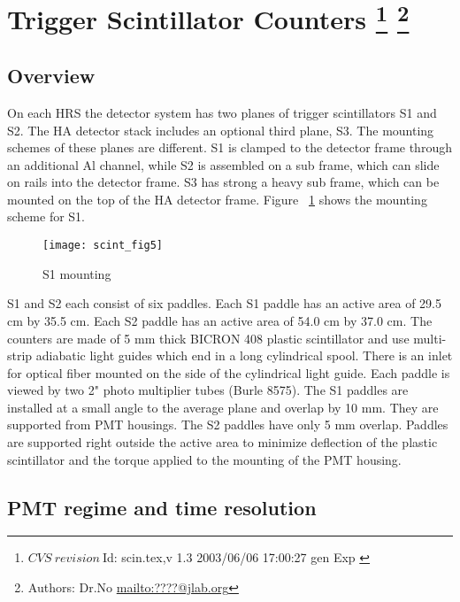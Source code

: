 \section[Trigger Scintillator Counters]{Trigger Scintillator Counters
\footnote{
  $CVS~revision~ $Id: scin.tex,v 1.3 2003/06/06 17:00:27 gen Exp $ $
}
\footnote{Authors: Dr.No \url{mailto:????@jlab.org}}
}
\subsection{Overview}

On each HRS the detector system has two planes of trigger
scintillators S1 and S2.
The HA detector stack includes an optional third plane, S3.
The mounting schemes
of these planes are different. S1 is clamped to the detector
frame through an additional Al channel,
while S2 is assembled on a sub frame, which can slide on rails into the
detector frame.
S3 has strong a heavy sub frame, which can be mounted on the top
of the HA detector frame. Figure ~\ref{fig:s1mount} shows the
mounting scheme for S1.

\begin{figure}[tbh]
\begin{center}
\texttt{[image: scint\_fig5]}
{\linespread{1.}
\caption[Detectors: S1 Mounting]{S1 mounting}
\label{fig:s1mount}}
\end{center}
\end{figure}


S1 and S2 each consist of six paddles. Each S1 paddle has an
active area of 29.5 cm by 35.5 cm.
Each S2 paddle has an active area of 54.0 cm by 37.0 cm. The
counters are made of 5 mm thick BICRON 
408 plastic scintillator and use multi-strip adiabatic light
guides which end in a long cylindrical spool. There is an inlet
for optical fiber mounted on the side of the 
cylindrical light guide. Each paddle is viewed by two 2" photo
 multiplier tubes (Burle 8575).
The S1 paddles are installed at a small angle to the average
plane and overlap by 10 mm. They are 
supported from PMT housings. The S2 paddles have only 5 mm
overlap. Paddles are supported right 
outside the active area to minimize deflection of the plastic
scintillator and the torque applied to the mounting of the PMT housing.   

\subsection{PMT regime and time resolution}

